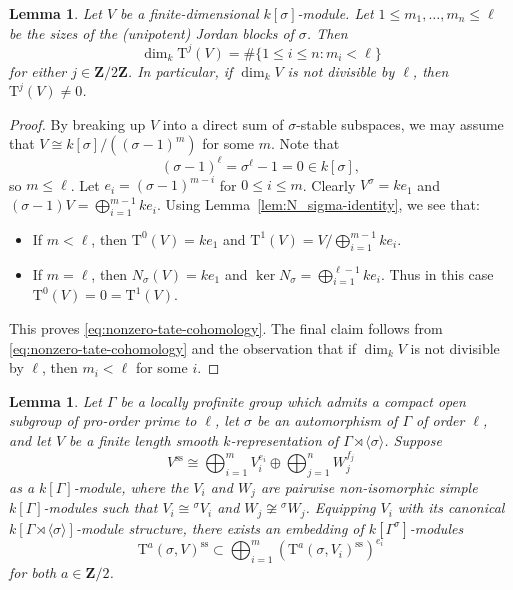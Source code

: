 \documentclass[reqno]{amsart}
\numberwithin{equation}{subsection}
\newcommand{\Z}{\mathbf{Z}}
\newcommand{\rT}{\ensuremath{\mathrm{T}}\xspace}
\renewcommand{\ss}{\mathrm{ss}}
\newtheorem{lemma}[thm]{Lemma}
\theoremstyle{remark}
\numberwithin{equation}{subsection}
\numberwithin{figure}{subsection}
\begin{document}
\begin{lemma}\label{lemma:nonzero-tate-cohomology}
Let $V$ be a finite-dimensional $k[\sigma]$-module. Let $1 \leq m_1, \dots, m_n \leq \ell$ be the sizes of the (unipotent) Jordan blocks of $\sigma$. Then
    \begin{equation}\label{eq:nonzero-tate-cohomology}
    \dim_k \rT^j(V) = \#\{1 \leq i \leq n\colon m_i < \ell\}
    \end{equation}
    for either $j \in \Z/2\Z$. In particular, if $\dim_k V$ is not divisible by $\ell$, then $\rT^j(V) \neq 0$.
\end{lemma}


\begin{proof}
    By breaking up $V$ into a direct sum of $\sigma$-stable subspaces, we may assume that $V \cong k[\sigma]/((\sigma-1)^m)$ for some $m$. Note that
    \[
    (\sigma-1)^\ell = \sigma^\ell -1 = 0 \in k[\sigma],
    \]
    so $m \leq \ell$. Let $e_i = (\sigma-1)^{m-i}$ for $0\leq i\leq m$. Clearly $V^\sigma = ke_1$ and $(\sigma-1)V = \bigoplus_{i=1}^{m-1} ke_i$. Using Lemma~\ref{lem:N_sigma-identity}, we see that:
    \begin{itemize}
    \item If $m < \ell$, then $\rT^0(V) = ke_1$ and $\rT^1(V) = V/\bigoplus_{i=1}^{m-1} ke_i$.
    \item If $m = \ell$, then $N_\sigma(V) = ke_1$ and $\ker N_\sigma = \bigoplus_{i=1}^{\ell-1} ke_i$. Thus in this case $\rT^0(V) = 0 = \rT^1(V)$.
    \end{itemize}
    This proves \eqref{eq:nonzero-tate-cohomology}. The final claim follows from \eqref{eq:nonzero-tate-cohomology} and the observation that if $\dim_k V$ is not divisible by $\ell$, then $m_i < \ell$ for some $i$.
\end{proof}

\begin{lemma}\label{lemma:tate-cohom-devissage}
    Let $\Gamma$ be a locally profinite group which admits a compact open subgroup of pro-order prime to $\ell$, let $\sigma$ be an automorphism of $\Gamma$ of order $\ell$, and let $V$ be a finite length smooth $k$-representation of $\Gamma \rtimes \langle\sigma\rangle$. Suppose 
    \[
    V^{\ss} \cong \bigoplus_{i=1}^m V_i^{e_i} \oplus \bigoplus_{j=1}^n W_j^{f_j}
    \]
    as a $k[\Gamma]$-module, where the $V_i$ and $W_j$ are pairwise non-isomorphic simple $k[\Gamma]$-modules such that $V_i \cong {}^\sigma V_i$ and $W_j \not\cong {}^\sigma W_j$. Equipping $V_i$ with its canonical $k[\Gamma \rtimes \langle\sigma\rangle]$-module structure, there exists an embedding of $k[\Gamma^\sigma]$-modules
    \[
    \rT^a(\sigma, V)^{\ss} \subset \bigoplus_{i=1}^m (\rT^a(\sigma, V_i)^{\ss})^{e_i}
    \]
    for both $a \in \Z/2$.
\end{lemma}
\end{document}
